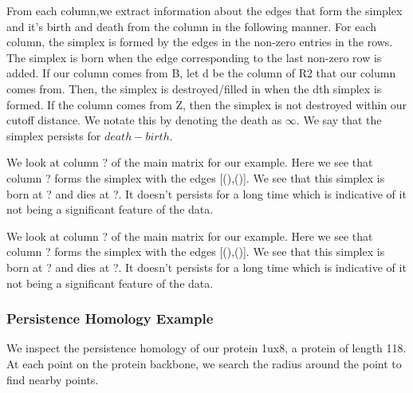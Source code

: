 \documentclass[12pt, a4paper, twocolumn, fullpage]{article}
\theoremstyle{plain}
\theoremstyle{definition}
\theoremstyle{remark}
\begin{document}
From each column,we extract information about the edges that form the simplex and it's birth and death from the column in the following manner. For each column, the simplex is formed by the edges in the non-zero entries in the rows. The simplex is born when the edge corresponding to the last non-zero row is added. If our column comes from B, let d be the column of R2 that our column comes from. Then, the simplex is destroyed/filled in when the dth simplex is formed. If the column comes from Z, then the simplex is not destroyed within our cutoff distance. We notate this by denoting the death as $\infty$. We say that the simplex persists for $death - birth$.

We look at column ? of the main matrix for our example. Here we see that column ? forms the simplex with the edges [(),()]. We see that this simplex is born at ? and dies at ?. It doesn't persists for a long time which is indicative of it not being a significant feature of the data.

We look at column ? of the main matrix for our example. Here we see that column ? forms the simplex with the edges [(),()]. We see that this simplex is born at ? and dies at ?. It doesn't persists for a long time which is indicative of it not being a significant feature of the data.

\subsubsection{Persistence Homology Example}

We inspect the persistence homology of our protein 1ux8, a protein of length 118. At each point on the protein backbone, we search the radius around the point to find nearby points.
\end{document}
